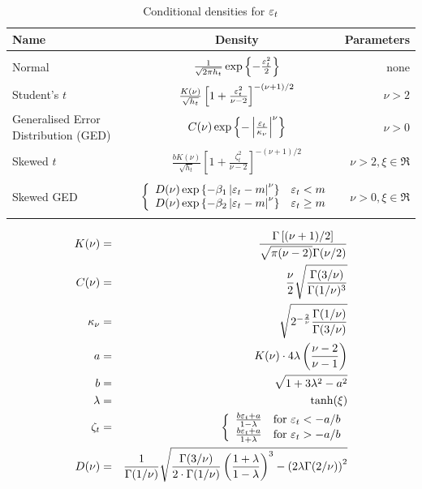 \documentclass[a4paper,11pt]{article}
\newcommand{\stdu}{\ensuremath \varepsilon}
\begin{document}
\begin{table}[hptb]
  \centering
  \begin{footnotesize}
  \begin{tabular}{p{}cr}
    \hline 
    \textbf{Name} &  \textbf{Density}  &  \textbf{Parameters} \\
    \hline 
    \\
    Normal & 
    $\frac{1}{\sqrt{2\pi h_t}} 
    \exp \left\{-\frac{\stdu_t^2}{2}\right\}$ & 
    none \\
    Student's $t$ & 
    $\frac{K(\nu)}{\sqrt{h_t}}
    \left[1+\frac{\stdu_t^2}{\nu-2}\right]^{-(\nu + 1)/2}$ &
    $\nu > 2$ \\
    Generalised Error Distribution (GED) &
    $C(\nu)\exp\left\{-\left|\frac{\stdu_t}{\kappa_\nu}\right|^\nu\right\}$
    & $\nu > 0$ \\
    Skewed $t$ & 
    $\frac{b K(\nu)}{\sqrt{h_t}}
    \left[1 + \frac{\zeta_t^2}{\nu - 2}\right]^{-(\nu + 1)/2}$ 
    & $\nu > 2, \xi \in \Re$ \\
    \\
    Skewed GED &
    $\left\{
      \begin{array}{cc}
        D(\nu) \exp\left\{-\beta_1 \left|\stdu_t - m\right|^\nu\right\} &
          \stdu_t < m \\
        D(\nu) \exp\left\{-\beta_2 \left|\stdu_t - m\right|^\nu\right\} &
          \stdu_t \ge m 
      \end{array}
    \right.$
    & $\nu > 0, \xi \in \Re$ \\
    \\
    \hline
    \hline
  \end{tabular}
  \end{footnotesize}

\begin{eqnarray*}
  K(\nu) & = &
  \frac{\Gamma\left[(\nu + 1)/2\right]}  {\sqrt{\pi (\nu - 2)}\Gamma(\nu/2)} \\
  C(\nu) & = &
  \frac{\nu}{2}\sqrt{\frac{\Gamma(3/\nu)}{\Gamma(1/\nu)^3}} \\
  \kappa_\nu & = &
  \sqrt{2^{-\frac{2}{\nu}}\frac{\Gamma(1/\nu)}{\Gamma(3/\nu)}} \\
  a & = & K(\nu) \cdot 4 \lambda  \left( \frac{\nu - 2}{\nu - 1} \right) \\
  b & = & \sqrt{1 + 3\lambda^2 - a^2} \\
  \lambda & = & \tanh(\xi) \\
  \zeta_t & = & \left\{
    \begin{array}{ll}
        \frac{b \stdu_t + a}{1-\lambda} & \mathrm{for\ } \stdu_t < -a/b \\
        \frac{b \stdu_t + a}{1+\lambda} & \mathrm{for\ } \stdu_t > -a/b
      \end{array}
      \right. \\
  D(\nu) & = & 
  \frac{1}{\Gamma(1/\nu)}\sqrt{\frac{\Gamma(3/\nu)}{2 \cdot \Gamma(1/\nu)}
  \left(\frac{1 + \lambda}{1 - \lambda}\right)^3 - 
  \left(2 \lambda \Gamma(2/\nu)\right)^2 } 
\end{eqnarray*}
  \caption{Conditional densities for $\stdu_t$}
  \label{tab:densities}
\end{table}
\end{document}
